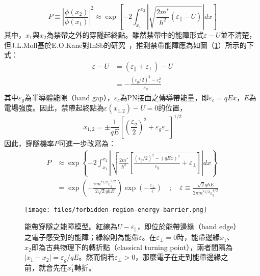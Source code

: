 \begin{equation}
P\equiv\left\vert\frac{\phi(x_2)}{\phi(x_1)}\right\vert^2\approx\exp\left[-2\int_{x_1}^{x_2}\left|\sqrt{\frac{2m^*}{\hbar^2}\left(\varepsilon_\parallel-U\right)}\right|dx\right]\label{eq:WKB-approximation}
\end{equation}
其中，$x_1$與$x_2$為禁帶之外的穿隧起終點。雖然禁帶中的能障形式$\varepsilon-U$並不清楚，但J.L.Moll基於E.O.Kane對InSb的研究~\cite{PhysSMCMoll:forbiddenGap}\cite{kane1960zener}，推測禁帶能障應為如圖（\ref{fig:energy-barrier}）所示的下式：
\begin{equation}
\begin{aligned}
\varepsilon-U&=(\varepsilon_\parallel+\varepsilon_\perp)-U\\[5pt]
&=-\frac{(\varepsilon_g/2)^2-\varepsilon_c^2}{\varepsilon_g}
\end{aligned}
\end{equation}
其中$\varepsilon_g$為半導體能隙（band gap），$\varepsilon_c$為PN接面之傳導帶能量，即$\varepsilon_c=qEx$，$E$為電場強度。因此，禁帶起終點為$\varepsilon(x_{1,2})-U=0$的位置，
\begin{equation}
x_{1,2}=\pm\frac{1}{qE}\left[\left(\frac{\varepsilon_g}{2}\right)^2+\varepsilon_g\varepsilon_\perp\right]^{1/2}\label{eq:turning-points}
\end{equation}
因此，穿隧機率$P$可進一步改寫為：
\begin{equation}
\begin{aligned}
P&\approx\exp\left\{-2\int_{x_1}^{x_2}\left|\sqrt{\frac{2m^*}{\hbar^2}\left[\frac{(\varepsilon_g/2)^2-(qEx)^2}{\varepsilon_g}+\varepsilon_\perp\right]}\right|dx\right\}\label{eq:rewritten-WKB-approx}\\[5pt]
&=\exp\left(-\frac{\pi m^{*1/2}\varepsilon_g^{3/2}}{2\sqrt{2}q\hbar E}\right)\exp\left(-\frac{\varepsilon_\perp}{\bar{\varepsilon}}\right)\quad;\quad\bar{\varepsilon}\equiv\frac{\sqrt{2}q\hbar E}{2\pi m^{*1/2}\varepsilon_g^{1/2}}
\end{aligned}
\end{equation}
\begin{figure}[h]
\centering
\texttt{[image: files/forbidden-region-energy-barrier.png]}
\caption[能帶穿隧之能障模型]{能帶穿隧之能障模型。紅線為$U-\varepsilon_\parallel$，即位於能帶邊緣（band edge）之電子感受到的能障；綠線則為能帶$\varepsilon$。在$\varepsilon_\perp=0$時，能帶邊緣$x_1$、$x_2$即為古典物理下的轉折點（classical turning point），兩者間隔為$\vert x_1-x_2\vert=\varepsilon_g/qE$。然而倘若$\varepsilon_\perp>0$，那麼電子在走到能帶邊緣之前，就會先在$x_1^\prime$轉折。}
\label{fig:energy-barrier}
\end{figure}

